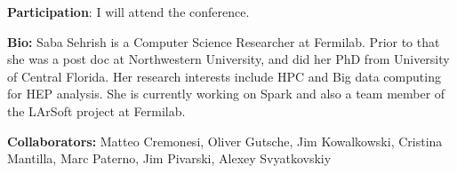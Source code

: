 \documentclass[11pt, twocolumn]{article}
\newcommand{\squeezeup}{\vspace{-5.5mm}}
\begin{document}
\squeezeup
\textbf{Participation}: I will attend the conference. 

\textbf{Bio:} 
Saba Sehrish is a Computer Science Researcher 
at Fermilab. Prior to that she was a post doc at Northwestern University, 
and did her PhD from University of Central Florida. 
Her research interests include HPC and Big data computing for HEP analysis.  
She is currently working on Spark and also a team member of the LArSoft 
project at Fermilab. 

\textbf{Collaborators: } 
Matteo Cremonesi, Oliver Gutsche, Jim Kowalkowski, 
Cristina Mantilla, Marc Paterno, Jim Pivarski, Alexey Svyatkovskiy
\squeezeup
\scriptsize


\end{document}
